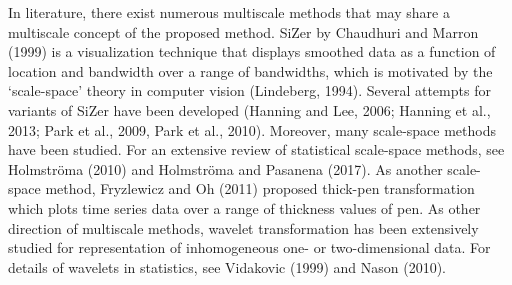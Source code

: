 \documentclass[preprint, review, 12pt]{article}
\theoremstyle{definition}
\theoremstyle{remark}
\begin{document}
In literature, there exist numerous multiscale methods that may share a multiscale concept of the proposed method. SiZer by Chaudhuri and Marron (1999) is a visualization technique that displays smoothed data as a function of location and bandwidth over a range of bandwidths, which is motivated by the `scale-space' theory in computer vision (Lindeberg, 1994). Several attempts for variants of SiZer have been developed (Hanning and Lee, 2006; Hanning et al., 2013; Park et al., 2009, Park et al., 2010). Moreover, many scale-space methods have been studied. For an extensive review of statistical scale-space methods, see Holmstr\"oma (2010) and Holmstr\"oma and Pasanena (2017). As another scale-space method, Fryzlewicz and Oh (2011) proposed thick-pen transformation which plots time series data over a range of thickness values of pen. As other direction of multiscale methods, wavelet transformation has been extensively studied for representation of inhomogeneous one- or two-dimensional data. For details of wavelets in statistics, see  Vidakovic (1999) and Nason (2010). 
\end{document}
